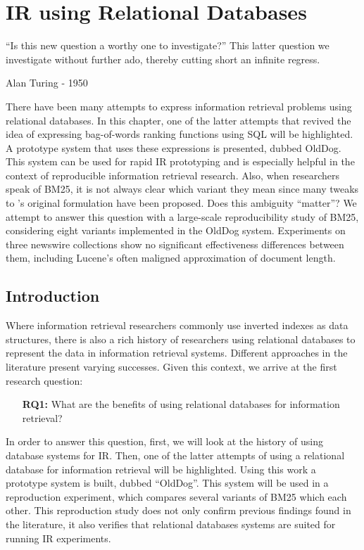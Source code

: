 \chapter{IR using Relational Databases}
\label{ir-using-relational-databases}
\epigraph{``Is this new question a worthy one to investigate?'' This latter question we investigate without further ado, thereby cutting short an infinite regress.}{Alan Turing - 1950}

\begin{Abstract}
	\begin{changemargin}{1cm}{1cm}
		There have been many attempts to express information retrieval problems using relational databases. In this chapter, one of the latter attempts that revived the idea of expressing bag-of-words ranking functions using SQL will be highlighted. A prototype system that uses these expressions is presented, dubbed OldDog. This system can be used for rapid IR prototyping and is especially helpful in the context of reproducible information retrieval research.
		Also, when researchers speak of BM25, it is not always clear which variant they mean since many tweaks to \citeauthor{bm25-robertson}'s original formulation have been proposed. Does this ambiguity ``matter''? We attempt to answer this question with a large-scale reproducibility study of BM25, considering eight variants implemented in the OldDog system. Experiments on three newswire collections show no significant effectiveness differences between them, including Lucene's often maligned approximation of document length.
	\end{changemargin}
\end{Abstract}

\section{Introduction}
Where information retrieval researchers commonly use inverted indexes as data structures, there is also a rich history of researchers using relational databases to represent the data in information retrieval systems. Different approaches in the literature present varying successes. Given this context, we arrive at the first research question: 
\begin{itemize}
	\item[\textbf{RQ1:}] What are the benefits of using relational databases for information retrieval?
\end{itemize}
In order to answer this question, first, we will look at the history of using database systems for IR. Then, one of the latter attempts of using a relational database for information retrieval will be highlighted. Using this work a prototype system is built, dubbed ``OldDog''. This system will be used in a reproduction experiment, which compares several variants of BM25 which each other. This reproduction study does not only confirm previous findings found in the literature, it also verifies that relational databases systems are suited for running IR experiments. 

